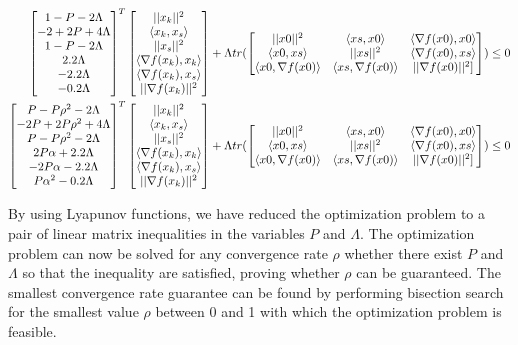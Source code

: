 \begin{subequations} \label{eqn:Ly_ineq2}
	\begin{align*}
		\begin{bmatrix}1-P-2\Lambda \\ -2+2P+4\Lambda \\ 1-P-2\Lambda \\ 2.2\Lambda \\ -2.2\Lambda \\ -0.2\Lambda\end{bmatrix}^T\begin{bmatrix}||x_k||^2 \\ \langle x_k, x_s \rangle \\ ||x_s||^2 \\ \langle \nabla f(x_k), x_k \rangle \\ \langle \nabla f(x_k), x_s \rangle \\ ||\nabla f(x_k)||^2\end{bmatrix} + \Lambda tr(\begin{bmatrix}||x0||^2 & \langle xs, x0 \rangle & \langle \nabla f(x0), x0 \rangle \\ \langle x0, xs \rangle & ||xs||^2 & \langle \nabla f(x0), xs \rangle \\ \langle x0, \nabla f(x0) \rangle & \langle xs, \nabla f(x0) \rangle & ||\nabla f(x0)||^2]\end{bmatrix}) \leq 0 \\
		\begin{bmatrix}P-P\rho^2-2\Lambda \\ -2P+2P\rho^2+4\Lambda \\ P-P\rho^2-2\Lambda \\ 2P\alpha+2.2\Lambda \\ -2P\alpha-2.2\Lambda \\ P\alpha^2-0.2\Lambda\end{bmatrix}^T\begin{bmatrix}||x_k||^2 \\ \langle x_k, x_s \rangle \\ ||x_s||^2 \\ \langle \nabla f(x_k), x_k \rangle \\ \langle \nabla f(x_k), x_s \rangle \\ ||\nabla f(x_k)||^2\end{bmatrix} + \Lambda tr(\begin{bmatrix}||x0||^2 & \langle xs, x0 \rangle & \langle \nabla f(x0), x0 \rangle \\ \langle x0, xs \rangle & ||xs||^2 & \langle \nabla f(x0), xs \rangle \\ \langle x0, \nabla f(x0) \rangle & \langle xs, \nabla f(x0) \rangle & ||\nabla f(x0)||^2]\end{bmatrix}	)\leq 0
	\end{align*}
\end{subequations}

By using Lyapunov functions, we have reduced the optimization problem to a pair of linear matrix inequalities in the variables $P$ and $\Lambda$. The optimization problem can now be solved for any convergence rate $\rho$ whether there exist $P$ and $\Lambda $ so that the inequality are satisfied, proving whether $\rho$ can be guaranteed. The smallest convergence rate guarantee can be found by performing bisection search for the smallest value $\rho$ between 0 and 1 with which the optimization problem is feasible.

